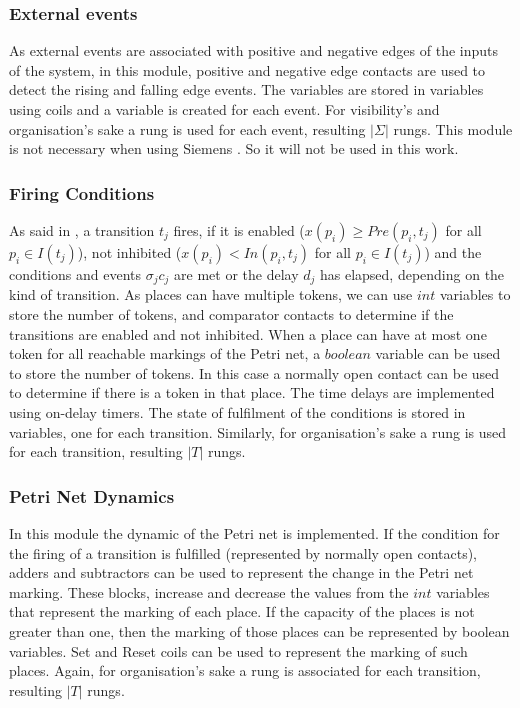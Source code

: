 \subsubsection{External events}
As external events are associated with positive and negative edges of the inputs
of the system, in this module, positive and negative edge contacts are used to
detect the rising and falling edge events. The variables are stored in variables
using coils and a variable is created for each event.
For visibility's and organisation's sake a rung is used for each event,
resulting $|\Sigma|$ rungs. This module is not necessary when using Siemens
\PLCs. So it will not be used in this work.
\subsubsection{Firing Conditions}
As said in , a transition $t_j$ fires, if it is 
enabled ($x(p_i)\geq Pre(p_i,t_j)$ for all $p_i\in I(t_j)$), not inhibited
($x(p_i)< In(p_i,t_j)$ for all $p_i\in I(t_j)$) and the conditions and events
$\sigma_jc_j$ are met or the delay $d_j$ has elapsed, depending on the kind of
transition.
As places can have multiple tokens, we can use $int$ variables to store the
number of tokens, and comparator contacts to determine if the transitions are
enabled and not inhibited.
When a place can have at most one token for all reachable markings of the
Petri net, a $boolean$ variable can be used to store the number of tokens. In this
case a normally open contact can be used to determine if there is a token
in that place.
The time delays are implemented using on-delay
timers. The state of fulfilment of the conditions is stored in variables, one
for each transition.
Similarly, for organisation's sake a rung is used for each transition, resulting
$|T|$ rungs.
\subsubsection{Petri Net Dynamics}
In this module the dynamic of the Petri net is implemented. If the condition for
the firing of a transition is fulfilled (represented by normally open contacts), adders and subtractors
can be used to represent the change in the Petri net marking. These blocks, increase and decrease the
values from the $int$ variables that represent the marking
of each place. If the capacity of the places is not greater than one, then the
marking of those places can be represented by boolean variables. Set and Reset coils can be used to
represent the marking of such places.
Again, for organisation's sake a rung is associated for each transition,
resulting $|T|$ rungs.

